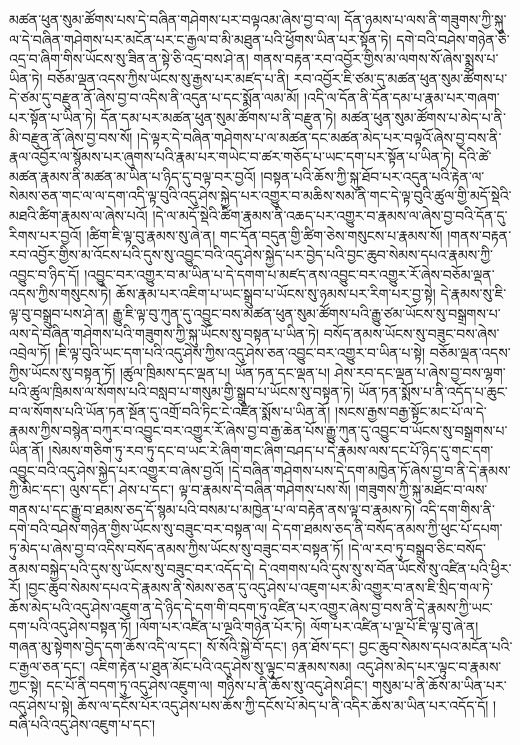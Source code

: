 མཚན་ཕུན་སུམ་ཚོགས་པས་དེ་བཞིན་གཤེགས་པར་བལྟའམ་ཞེས་བྱ་བ་ལ། དོན་ཉམས་པ་ལས་ནི་གཟུགས་ཀྱི་སྐུ་ལ་དེ་བཞིན་གཤེགས་པར་མངོན་པར་ང་རྒྱལ་བ་མི་མཐུན་པའི་ཕྱོགས་ཡིན་པར་སྟོན་ཏེ། དགེ་བའི་བཤེས་གཉེན་ཅི་འདྲ་བ་ཞིག་གིས་ཡོངས་སུ་ཟིན་ན་སྟེ་ཅི་འདྲ་བས་ཤེ་ན། གནས་བརྟན་རབ་འབྱོར་གྱིས་མ་ལགས་སོ་ཞེས་སྨྲས་པ་ཡིན་ཏེ། བཅོམ་ལྡན་འདས་ཀྱིས་ཡོངས་སུ་རྒྱས་པར་མཛད་པ་ནི། རབ་འབྱོར་ཇི་ཙམ་དུ་མཚན་ཕུན་སུམ་ཚོགས་པ་དེ་ཙམ་དུ་བརྫུན་ནོ་ཞེས་བྱ་བ་འདིས་ནི་འདུན་པ་དང་སྨོན་ལམ་མོ། །འདི་ལ་དོན་ནི་དོན་དམ་པ་རྣམ་པར་གཞག་པར་སྟོན་པ་ཡིན་ཏེ། དོན་དམ་པར་མཚན་ཕུན་སུམ་ཚོགས་པ་ནི་བརྫུན་ཏེ། མཚན་ཕུན་སུམ་ཚོགས་པ་མེད་པ་ནི་མི་བརྫུན་ནོ་ཞེས་བྱ་བས་སོ། །དེ་ལྟར་དེ་བཞིན་གཤེགས་པ་ལ་མཚན་དང་མཚན་མེད་པར་བལྟའོ་ཞེས་བྱ་བས་ནི་རྣལ་འབྱོར་ལ་སྙོམས་པར་ཞུགས་པའི་རྣམ་པར་གཡེང་བ་ཚར་གཅོད་པ་ཡང་དག་པར་སྟོན་པ་ཡིན་ཏེ། དེའི་ཚེ་མཚན་རྣམས་ནི་མཚན་མ་ཡིན་པ་ཉིད་དུ་བལྟ་བར་བྱའོ། །བསྟན་པའི་ཆོས་ཀྱི་སྐུ་ཐོབ་པར་འདུན་པའི་རྟེན་ལ་སེམས་ཅན་གང་ལ་ལ་དག་འདི་ལྟ་བུའི་འདུ་ཤེས་སྐྱེད་པར་འགྱུར་བ་མཆིས་སམ་ནི་གང་དེ་ལྟ་བུའི་ཚུལ་གྱི་མདོ་སྡེའི་མཐའི་ཚིག་རྣམས་ལ་ཞེས་པའོ། །དེ་ལ་མདོ་སྡེའི་ཚིག་རྣམས་ནི་འཆད་པར་འགྱུར་བ་རྣམས་ལ་ཞེས་བྱ་བའི་དོན་དུ་རིགས་པར་བྱའོ། །ཚིག་ཇི་ལྟ་བུ་རྣམས་སུ་ཞེ་ན། གང་དོན་བདུན་གྱི་ཚིག་ཅེས་གསུངས་པ་རྣམས་སོ། །གནས་བརྟན་རབ་འབྱོར་གྱིས་མ་འོངས་པའི་དུས་སུ་འབྱུང་བའི་འདུ་ཤེས་སྐྱེད་པར་བྱེད་པའི་བྱང་ཆུབ་སེམས་དཔའ་རྣམས་ཀྱི་འབྱུང་བ་ཉིད་དོ། །འབྱུང་བར་འགྱུར་བ་མ་ཡིན་པ་དེ་དགག་པ་མཛད་ནས་འབྱུང་བར་འགྱུར་རོ་ཞེས་བཅོམ་ལྡན་འདས་ཀྱིས་གསུངས་ཏེ། ཆོས་རྣམ་པར་འཇིག་པ་ཡང་སྒྲུབ་པ་ཡོངས་སུ་ཉམས་པར་རིག་པར་བྱ་སྟེ། དེ་རྣམས་སུ་ཇི་ལྟ་བུ་བསྒྲུབ་པས་ཤེ་ན། རྒྱུ་ཇི་ལྟ་བུ་ཀུན་དུ་འབྱུང་བས་མཚན་ཕུན་སུམ་ཚོགས་པའི་རྒྱུ་ཙམ་ཡོངས་སུ་བསྒྲགས་པ་ལས་དེ་བཞིན་གཤེགས་པའི་གཟུགས་ཀྱི་སྐུ་ཡོངས་སུ་བསྟན་པ་ཡིན་ཏེ། བསོད་ནམས་ཡོངས་སུ་བཟུང་བས་ཞེས་འབྲེལ་ཏོ། །ཇི་ལྟ་བུའི་ཡང་དག་པའི་འདུ་ཤེས་ཀྱིས་འདུ་ཤེས་ཅན་འབྱུང་བར་འགྱུར་བ་ཡིན་པ་སྟེ། བཅོམ་ལྡན་འདས་ཀྱིས་ཡོངས་སུ་བསྟན་ཏོ། །ཚུལ་ཁྲིམས་དང་ལྡན་པ། ཡོན་ཏན་དང་ལྡན་པ། ཤེས་རབ་དང་ལྡན་པ་ཞེས་བྱ་བས་ལྷག་པའི་ཚུལ་ཁྲིམས་ལ་སོགས་པའི་བསླབ་པ་གསུམ་གྱི་སྒྲུབ་པ་ཡོངས་སུ་བསྟན་ཏེ། ཡོན་ཏན་སྨོས་པ་ནི་འདོད་པ་ཆུང་བ་ལ་སོགས་པའི་ཡོན་ཏན་སྔོན་དུ་འགྲོ་བའི་ཏིང་ངེ་འཛིན་སྨོས་པ་ཡིན་ནོ། །སངས་རྒྱས་བརྒྱ་སྟོང་མང་པོ་ལ་དེ་རྣམས་ཀྱིས་བསྙེན་བཀུར་བ་འབྱུང་བར་འགྱུར་རོ་ཞེས་བྱ་བ་རྒྱ་ཆེན་པོས་རྒྱུ་ཀུན་དུ་འབྱུང་བ་ཡོངས་སུ་བསྒྲགས་པ་ཡིན་ནོ། །སེམས་གཅིག་ཏུ་རབ་ཏུ་དང་བ་ཡང་རེ་ཞིག་གང་ཞིག་བཤད་པ་དེ་རྣམས་ལས་དང་པོ་ཉིད་དུ་གང་དག་འབྱུང་བའི་འདུ་ཤེས་སྐྱེད་པར་འགྱུར་བ་ཞེས་བྱའོ། །དེ་བཞིན་གཤེགས་པས་དེ་དག་མཁྱེན་ཏོ་ཞེས་བྱ་བ་ནི་དེ་རྣམས་ཀྱི་མིང་དང་། ལུས་དང་། ཤེས་པ་དང་། ལྟ་བ་རྣམས་དེ་བཞིན་གཤེགས་པས་སོ། །གཟུགས་ཀྱི་སྐུ་མཐོང་བ་ལས་གནས་པ་དང་རྒྱུ་བ་ཐམས་ཅད་དོ་སྙམ་པའི་བསམ་པ་མཁྱེན་པ་ལ་བརྟེན་ནས་ལྟ་བ་རྣམས་ཏེ། འདི་དག་གིས་ནི་དགེ་བའི་བཤེས་གཉེན་གྱིས་ཡོངས་སུ་བཟུང་བར་བསྟན་ལ། དེ་དག་ཐམས་ཅད་ནི་བསོད་ནམས་ཀྱི་ཕུང་པོ་དཔག་ཏུ་མེད་པ་ཞེས་བྱ་བ་འདིས་བསོད་ནམས་ཀྱིས་ཡོངས་སུ་བཟུང་བར་བསྟན་ཏོ། །དེ་ལ་རབ་ཏུ་བསྒྲུབ་ཅིང་བསོད་ནམས་བསྐྱེད་པའི་དུས་སུ་ཡོངས་སུ་བཟུང་བར་འདོད་དེ། དེ་འགགས་པའི་དུས་སུ་ས་བོན་ཡོངས་སུ་འཛིན་པའི་ཕྱིར་རོ། །བྱང་ཆུབ་སེམས་དཔའ་དེ་རྣམས་ནི་སེམས་ཅན་དུ་འདུ་ཤེས་པ་འཇུག་པར་མི་འགྱུར་བ་ནས་ཇི་སྲིད་གལ་ཏེ་ཆོས་མེད་པའི་འདུ་ཤེས་འཇུག་ན་དེ་ཉིད་དེ་དག་གི་བདག་ཏུ་འཛིན་པར་འགྱུར་ཞེས་བྱ་བས་ནི་དེ་རྣམས་ཀྱི་ཡང་དག་པའི་འདུ་ཤེས་བསྟན་ཏོ། །ལོག་པར་འཛིན་པ་ལྔའི་གཉེན་པོར་ཏེ། ལོག་པར་འཛིན་པ་ལྔ་པོ་ཇི་ལྟ་བུ་ཞེ་ན། གཞན་མུ་སྟེགས་བྱེད་དག་ཆོས་འདི་ལ་དང་། སོ་སོའི་སྐྱེ་བོ་དང་། ཉན་ཐོས་དང་། བྱང་ཆུབ་སེམས་དཔའ་མངོན་པའི་ང་རྒྱལ་ཅན་དང་། འཇིག་རྟེན་པ་ཐུན་མོང་པའི་འདུ་ཤེས་སུ་ལྟུང་བ་རྣམས་སམ། འདུ་ཤེས་མེད་པར་ལྟུང་བ་རྣམས་ཀྱང་སྟེ། དང་པོ་ནི་བདག་ཏུ་འདུ་ཤེས་འཇུག་ལ། གཉིས་པ་ནི་ཆོས་སུ་འདུ་ཤེས་ཤིང་། གསུམ་པ་ནི་ཆོས་མ་ཡིན་པར་འདུ་ཤེས་པ་སྟེ། ཆོས་ལ་དངོས་པོར་འདུ་ཤེས་པས་ཆོས་ཀྱི་དངོས་པོ་མེད་པ་ནི་འདིར་ཆོས་མ་ཡིན་པར་འདོད་དོ། །བཞི་པའི་འདུ་ཤེས་འཇུག་པ་དང་། 